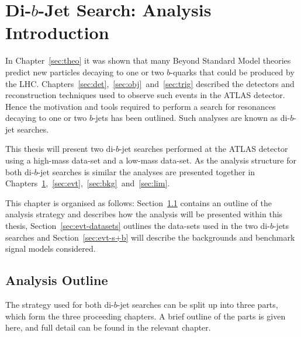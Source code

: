 \chapter{Di-$b$-Jet Search: Analysis Introduction}
\label{sec:ana}

In Chapter~\ref{sec:theo} it was shown that many Beyond Standard Model theories
predict new particles decaying to one or two $b$-quarks that could be produced by the LHC.
Chapters~\ref{sec:det},~\ref{sec:obj}~and~\ref{sec:trig}
described the detectors and reconstruction techniques used to observe such events in the ATLAS detector.
Hence the motivation and tools required to perform a  search
for resonances decaying to one or two $b$-jets has been outlined.
Such analyses are known as di-$b$-jet searches.

This thesis will present two di-$b$-jet searches performed
at the ATLAS detector using a high-mass data-set and a low-mass data-set.
As the analysis structure for both di-$b$-jet searches is similar the analyses are presented together
in Chapters~\ref{sec:ana},~\ref{sec:evt},~\ref{sec:bkg}~and~\ref{sec:lim}.

This chapter is organised as follows:
Section~\ref{sec:ana-outline} contains an outline of the analysis strategy and describes how the analysis will be presented within this thesis,
Section~\ref{sec:evt-datasets} outlines the data-sets used in the two di-$b$-jets searches
and Section~\ref{sec:evt-s+b} will describe the backgrounds and benchmark signal models considered.

\section{Analysis Outline}
\label{sec:ana-outline}

The strategy used for both di-$b$-jet searches
can be split up into three parts,
which form the three proceeding chapters.
A brief outline of the parts is given here,
and full detail can be found in the relevant chapter.

